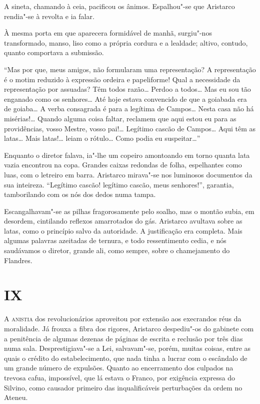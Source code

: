 A sineta, chamando à ceia, pacificou os ânimos. Espalhou"-se que Aristarco
rendia"-se à revolta e ia falar. 

À mesma porta em que aparecera
formidável de manhã, surgiu"-nos transformado, manso, liso como a
própria cordura e a lealdade; altivo, contudo, quanto comportava a
submissão. 

``Mas por que, meus amigos, não formularam uma representação?
A representação é o motim
reduzido à expressão ordeira e papeliforme! Qual a necessidade da
representação por assuadas? Têm todos razão\ldots{} Perdoo a todos\ldots{} Mas
eu sou tão enganado como os senhores\ldots{} Até hoje estava convencido de
que a goiabada era de goiaba\ldots{} A verba consagrada é para a legítima de
Campos\ldots{} Nesta casa não há misérias!\ldots{} Quando alguma coisa faltar,
reclamem que aqui estou eu para as providências, vosso Mestre, vosso
pai!\ldots{} Legítimo cascão de Campos\ldots{} Aqui têm as latas\ldots{} Mais
latas!\ldots{} leiam o rótulo\ldots{} Como podia eu suspeitar\ldots{}'' 

Enquanto o diretor falava, ia"-lhe um copeiro amontoando em torno quanta lata
vazia encontrou na copa. Grandes caixas redondas de folha, espelhantes
como luas, com o letreiro em barra. Aristarco mirava"-se nos luminosos
documentos da sua inteireza. ``Legítimo cascão! legítimo cascão, meus
senhores!'', garantia, tamborilando com os nós dos dedos numa tampa.

Escangalhavam"-se as pilhas fragorosamente pelo soalho, mas o montão
subia, em desordem, cintilando reflexos amarrotados do gás. Aristarco
avultava sobre as latas, como o princípio salvo da autoridade. A
justificação era completa. Mais algumas palavras azeitadas de ternura,
e todo ressentimento cedia, e nós saudávamos o diretor, grande ali,
como sempre, sobre o chamejamento do Flandres.

\section{IX}

\noindent\textsc{A anistia} dos revolucionários aproveitou por extensão aos execrandos
réus da moralidade. Já frouxa a fibra dos rigores, Aristarco
despediu"-os do gabinete com a penitência de algumas dezenas de
páginas de escrita e reclusão por três dias numa sala.
Desprestigiava"-se a Lei, salvavam"-se, porém, muitas coisas, entre
as quais o crédito do estabelecimento, que nada tinha a lucrar com o
escândalo de um grande número de expulsões. Quanto ao encerramento dos
culpados na trevosa cafua, impossível, que lá estava o Franco, por
exigência expressa do Silvino, como causador primeiro das
inqualificáveis perturbações da ordem no Ateneu. 


